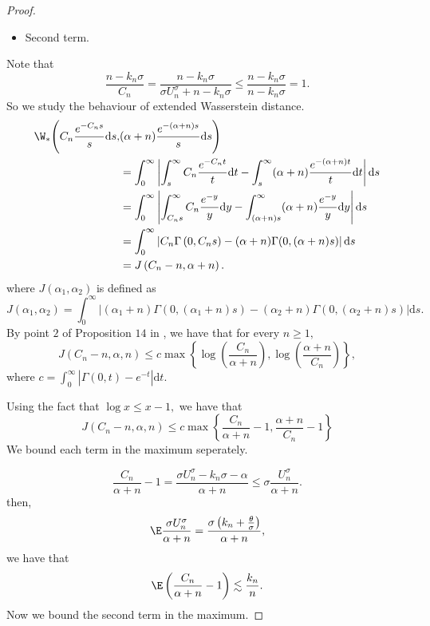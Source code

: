 \begin{proof}
   
    \begin{itemize}
        \item Second term.
    \end{itemize}
    Note that 
    \[
    \frac{n-k_n\sigma}{C_n} = \frac{n-k_n\sigma}{ \sigma U_n^\sigma + n - k_n\sigma} \leq \frac{n-k_n\sigma}{n-k_n\sigma} = 1.
    \]
    So we study the behaviour of extended Wasserstein distance.
    \begin{align*}
    \W_*\Bigg( C_n\frac{e^{-C_ns}}{s}\mathrm{d}s, & (\alpha + n)\frac{e^{-(\alpha +n)s}}{s}\mathrm{d}s\Bigg) \\ 
    & = \int_0^\infty \left| \int_s^\infty C_n \frac{e^{-C_nt}}{t}\mathrm{d}t - \int_s^\infty (\alpha + n)\frac{e^{-(\alpha +n)t}}{t}\mathrm{d}t\right|\mathrm{d}s \\ 
    & = \int_0^\infty \left| \int_{C_ns}^\infty C_n \frac{e^{-y}}{y}\mathrm{d}y - \int_{(\alpha+n)s}^\infty (\alpha + n)\frac{e^{-y}}{y}\mathrm{d}y\right|\mathrm{d}s\\
    & = \int_0^\infty \left| C_n\Gamma\left(0,C_ns\right) - (\alpha + n)\Gamma(0, (\alpha + n)s) \right|\mathrm{d}s \\
    & = J\left(C_n-n,\alpha + n\right).
    \end{align*}
    where $J\left(\alpha_1, \alpha_2\right)$ is defined as
    \[
    J\left(\alpha_1, \alpha_2\right) = \int_0^\infty \left| (\alpha_1 + n)\Gamma(0,(\alpha_1 + n)s) - (\alpha_2+n)\Gamma(0,(\alpha_2 +n)s) \right|\mathrm{d}s.
    \] 
    By point $2$ of Proposition $14$ in \cite{catalano2023merging}, we have that for every $n \geq 1,$
    \[
    J\left(C_n - n, \alpha, n\right) \leq c \max\left\{ \log\left( \frac{C_n}{\alpha + n}\right), \log\left( \frac{\alpha + n}{C_n}\right)\right\},
    \]
    where $c  =\int_0^\infty \left| \Gamma(0, t) - e^{-t} \right|\mathrm{d}t.$

    Using the fact that $\log x \leq x - 1,$ we have that 
    \[
    J\left(C_n - n, \alpha, n\right) \leq c \max \left\{ \frac{C_n}{\alpha + n}-1, \frac{\alpha + n}{C_n} - 1\right\}
    \]
    We bound each term in the maximum seperately.

    \[
    \frac{C_n}{\alpha + n} - 1 = \frac{ \sigma U_n^\sigma - k_n \sigma - \alpha}{\alpha + n} \leq  \sigma \frac{U_n^\sigma}{\alpha + n}.
    \]
    then,
    \[
    \E \frac{ \sigma U_n^\sigma}{\alpha + n} = \frac{\sigma\left(k_n + \frac{\theta}{\sigma}\right)}{\alpha + n},
    \]
    we have that
    \[
    \E \left( \frac{C_n}{\alpha + n} - 1\right) \lesssim \frac{k_n}{n}.
    \]
    Now we bound the second term in the maximum.


\end{proof}
